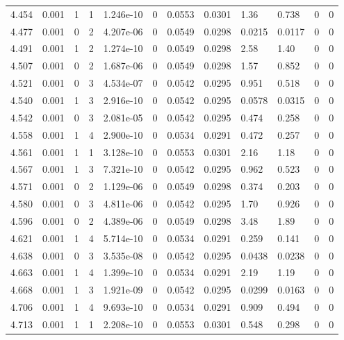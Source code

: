 \documentclass[preview]{standalone}
\begin{document}
{{{{{{{{\begin{tabular}{L{1.2cm}C{1.2cm} C{0.3cm}C{0.5cm} C{1.4cm}C{1.4cm} C{1.4cm}C{1.4cm} C{1.6cm}C{1.6cm} C{1.6cm}C{1.6cm}}
  4.454  &  0.001  & 1     &  1 &  1.246e-10  & 0  &  0.0553&   0.0301& 1.36 & 0.738   &  0 & 0  \\ 
  4.477  &  0.001  & 0     &  2 &  4.207e-06  & 0  &  0.0549&   0.0298& 0.0215 & 0.0117   &  0 & 0  \\ 
  4.491  &  0.001  & 1     &  2 &  1.274e-10  & 0  &  0.0549&   0.0298& 2.58 & 1.40   &  0 & 0  \\ 
  4.507  &  0.001  & 0     &  2 &  1.687e-06  & 0  &  0.0549&   0.0298& 1.57 & 0.852   &  0 & 0  \\ 
  4.521  &  0.001  & 0     &  3 &  4.534e-07  & 0  &  0.0542&   0.0295& 0.951 & 0.518   &  0 & 0  \\ 
  4.540  &  0.001  & 1     &  3 &  2.916e-10  & 0  &  0.0542&   0.0295& 0.0578 & 0.0315   &  0 & 0  \\ 
  4.542  &  0.001  & 0     &  3 &  2.081e-05  & 0  &  0.0542&   0.0295& 0.474 & 0.258   &  0 & 0  \\ 
  4.558  &  0.001  & 1     &  4 &  2.900e-10  & 0  &  0.0534&   0.0291& 0.472 & 0.257   &  0 & 0  \\ 
  4.561  &  0.001  & 1     &  1 &  3.128e-10  & 0  &  0.0553&   0.0301& 2.16 & 1.18   &  0 & 0  \\ 
  4.567  &  0.001  & 1     &  3 &  7.321e-10  & 0  &  0.0542&   0.0295& 0.962 & 0.523   &  0 & 0  \\ 
  4.571  &  0.001  & 0     &  2 &  1.129e-06  & 0  &  0.0549&   0.0298& 0.374 & 0.203   &  0 & 0  \\ 
  4.580  &  0.001  & 0     &  3 &  4.811e-06  & 0  &  0.0542&   0.0295& 1.70 & 0.926   &  0 & 0  \\ 
  4.596  &  0.001  & 0     &  2 &  4.389e-06  & 0  &  0.0549&   0.0298& 3.48 & 1.89   &  0 & 0  \\ 
  4.621  &  0.001  & 1     &  4 &  5.714e-10  & 0  &  0.0534&   0.0291& 0.259 & 0.141   &  0 & 0  \\ 
  4.638  &  0.001  & 0     &  3 &  3.535e-08  & 0  &  0.0542&   0.0295& 0.0438 & 0.0238   &  0 & 0  \\ 
  4.663  &  0.001  & 1     &  4 &  1.399e-10  & 0  &  0.0534&   0.0291& 2.19 & 1.19   &  0 & 0  \\ 
  4.668  &  0.001  & 1     &  3 &  1.921e-09  & 0  &  0.0542&   0.0295& 0.0299 & 0.0163   &  0 & 0  \\ 
  4.706  &  0.001  & 1     &  4 &  9.693e-10  & 0  &  0.0534&   0.0291& 0.909 & 0.494   &  0 & 0  \\ 
  4.713  &  0.001  & 1     &  1 &  2.208e-10  & 0  &  0.0553&   0.0301& 0.548 & 0.298   &  0 & 0  \\ 

\end{tabular}}}}}}}}}
\end{document}
